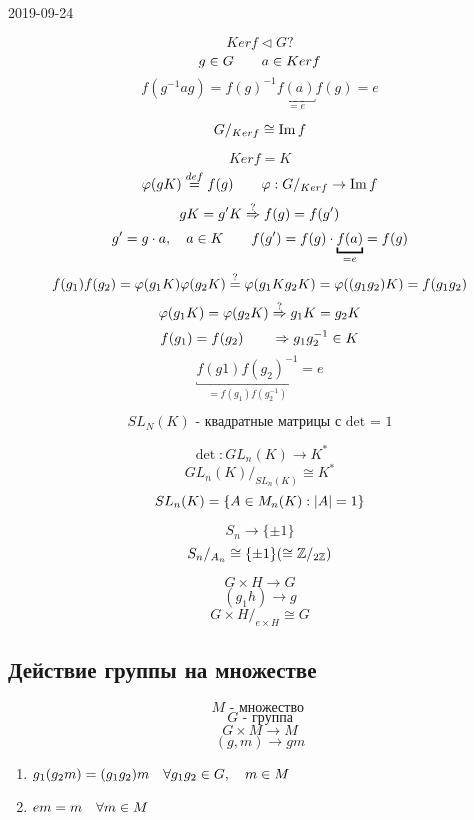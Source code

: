 \documentclass[12pt, fleqn]{article}
\begin{document}
\begin{lect} {2019-09-24}
	\begin{Proof}
	    \[Ker f \triangleleft G ?\]
		\[g \in G \quad\quad a \in Ker f\]
		\[f(g^{-1} a g) = f(g)^{-1} \underbracket{f(a)}_{= e} f(g) = e\]
	\end{Proof}

	\begin{Utv} 
			\[G/_{Ker f} \cong \mathop{\rm Im}\nolimits f \]
	\end{Utv}
	\begin{Proof}
			\[Ker f = K\]
			\[\varphi(gK) \overset{def}{=} f(g) \quad\quad \varphi: G/_{Ker f} \to \mathop{\rm Im}\nolimits f\]
			\[gK = g'K \overset{?}{\Rightarrow} f(g) = f(g')\]
			\[g' = g \cdot a, \q a \in K \q\q f(g') = f(g) \cdot \underbracket{f(a)}_{= e} = f(g) \]
			\[f(g_1)f(g_2) = \varphi(g_1K) \varphi(g_2K) \overset{?}{=} \varphi(g_1 K g_2 K) = \varphi((g_1g_2)K) =
			f(g_1g_2)\]
			\[\varphi(g_1K) = \varphi(g_2K) \overset{?}{\Rightarrow} g_1K = g_2 K\]
			\[f(g_1) = f(g_2) \quad\quad \Rightarrow g_1 g_2^{-1} \in K \]
			\[\underbracket{f(g1)f(g_2)^{-1}}_{= f(g_1)f(g_2^{-1})}  = e \]
	\end{Proof}

	\begin{Reminder}
		\[SL_N(K) \text{ - квадратные матрицы с det = 1}\]
	\end{Reminder}

	\begin{Definition}
		\[\det: GL_n(K) \to K^*\] %
		\[GL_n(K) / _{SL_n(K)} \cong K^*\]
		\[SL_n(K) = \{A \in M_n(K) : \left|A\right| = 1\}\]
	\end{Definition}

	\begin{Example}[1]
			\[S_n \to \{\pm 1\}\]
			\[S_n / _{A_n} \cong \{\pm 1\} (\cong \mathbb{Z}/_{2\mathbb{Z}} ) \]
	\end{Example}

	\begin{Example}[2]
		\[G \times H \to G\]
		\[(g_1 h) \to g\]
		\[G \times H /_{e \times H} \cong G\]
	\end{Example}

	\subsection{Действие группы на множестве}
	\begin{Definition}
		\[M \text{ - множество } \]
		\[G \text{ - группа}\]
		\[G \times M \to  M\]
		\[(g, m) \to gm\]
		\begin{enumerate}
			\item $g_1(g_2m) = (g_1g_2)m \quad \forall g_1 g_2 \in G, \quad m \in M$
			\item $em = m \quad \forall m \in  M$
		\end{enumerate}
	\end{Definition}


\end{lect}
\end{document}
